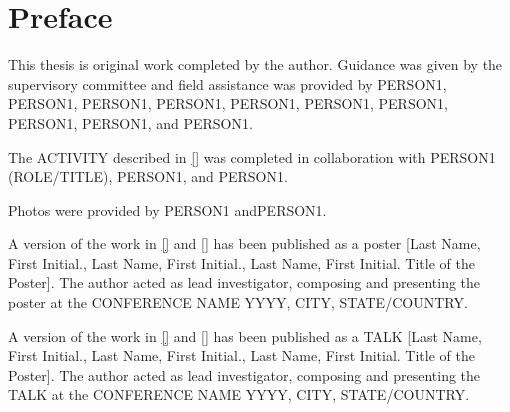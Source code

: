 \chapter{Preface}

This thesis is original work completed by the author.  Guidance was given by the supervisory committee and field assistance was provided by PERSON1, PERSON1, PERSON1, PERSON1, PERSON1, PERSON1, PERSON1, PERSON1, PERSON1, and PERSON1.

The ACTIVITY described in \autoref{} was completed in collaboration with PERSON1 (ROLE/TITLE), PERSON1, and PERSON1. 

Photos were provided by PERSON1 andPERSON1. 

A version of the work in \autoref{} and \autoref{} has been published as a poster [Last Name, First Initial., Last Name, First Initial., Last Name, First Initial. Title of the Poster]. The author acted as lead investigator, composing and presenting the poster at the CONFERENCE NAME YYYY, CITY, STATE/COUNTRY.

A version of the work in \autoref{} and \autoref{} has been published as a TALK [Last Name, First Initial., Last Name, First Initial., Last Name, First Initial. Title of the Poster]. The author acted as lead investigator, composing and presenting the TALK at the CONFERENCE NAME YYYY, CITY, STATE/COUNTRY.
